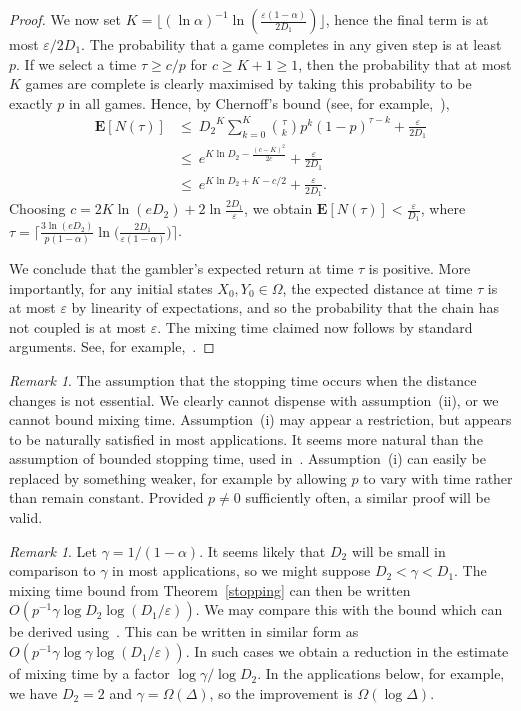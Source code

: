 \documentclass[11pt]{article}
\theoremstyle{definition}
\theoremstyle{remark}
\newtheorem{rem}[thm]{Remark}
\newcommand{\eps}{\varepsilon}
\newcommand{\e}{\mathbf{E}}
\begin{document}
\begin{proof}
We now set $K =\lfloor(\ln \alpha)^{-1}\ln
(\frac{\eps(1-\alpha)}{2D_1})\rfloor$, hence the final term is at most
$\eps/2D_1$. The probability that a game completes in any given step is at
least $p$. If we select a time $\tau \geq c/p$ for $c \geq
K+1\geq 1$, then the probability that at most $K$ games are complete is
clearly maximised by taking this probability to be exactly $p$ in all
games. Hence, by Chernoff's bound (see, for example,~\cite[Theorem
2.1]{JLR00}),
\begin{align*}
\e[N(\tau)]&\leq\ {D_2}^K\sum_{k=0}^{K}
\binom{\tau}{k}p^k(1-p)^{\tau-k}+\frac{\eps}{2D_1} \\
&\leq\ e^{K\ln D_2-\frac{(c-K)^2}{2c}}+\frac{\eps}{2D_1} \\
&\leq\ e^{K\ln D_2+K-c/2}+\frac{\eps}{2D_1}.
\end{align*}
Choosing $c=2K\ln(eD_2) +2\ln \frac{2D_1}{\eps}$, we obtain $ \e[N(\tau)] <
\frac{\eps}{D_1} $, where $ \tau =\big\lceil
\frac{3\ln(eD_2)}{p(1-\alpha)}\ln\big(\frac{2D_1}{\eps(1-\alpha)}\big)\big\rceil$.

We conclude that the gambler's expected return at time $\tau$ is positive.
More importantly, for any initial states $X_0,Y_0\in \Omega$, the expected
distance at time $\tau$ is at most $\eps$ by linearity of expectations, and
so the probability that the chain has not coupled is at most $\eps$. The
mixing time claimed now follows by standard arguments. See, for
example,~\cite{J03}.
\end{proof}

\begin{rem}\label{rem15}
The assumption that the stopping time occurs when the distance changes is
not essential. We clearly cannot dispense with assumption~(ii), or we
cannot bound mixing time. Assumption~(i) may appear a restriction, but
appears to be naturally satisfied in most applications. It seems more
natural than the assumption of bounded stopping time, used in~\cite{HV04}.
Assumption~(i) can easily be replaced by something weaker, for
example by allowing $p$ to vary with time rather than remain constant.
Provided $p\neq 0$ sufficiently often, a similar proof will be valid.
\end{rem}

\begin{rem}\label{rem20}
Let $\gamma=1/(1-\alpha)$. It seems likely that $D_2$ will be small in
comparison to $\gamma$ in most applications, so we might suppose $D_2 <
\gamma < D_1$. The mixing time bound from Theorem~\ref{stopping} can then
be written $O(p^{-1}\gamma\log D_2 \log(D_1/\eps) )$. We may compare this
with the bound which can be derived using~\cite[Corollary~4]{HV04}. This
can be written in similar form as $O(p^{-1}\gamma \log\gamma\log( D_1/\eps)
)$. In such cases we obtain a reduction in the estimate of mixing time by a
factor $\log\gamma/\log D_2$. In the applications below, for example, we
have $D_2=2$ and $\gamma=\Omega(\Delta)$, so the improvement is
$\Omega(\log \Delta)$.
\end{rem}
\end{document}
